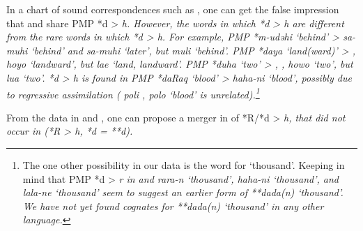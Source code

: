 In a chart of sound correspondences such as ,
one can get the false impression that 
and  share PMP *d > \it{h}.
However, the words in which  *d > \it{h} are different
from the rare  words in which *d > \it{h}.
For example, PMP *m-udəhi ‘behind’ >  \it{sa-muhi} ‘behind’
and  \it{sa-muhi} ‘later’,
but  \it{muli} ‘behind’.
PMP *daya ‘land(ward)’ > ,
 \it{hoyo} ‘landward’, but  \it{lae} ‘land, landward’.
PMP *duha ‘two’ > ,
,  \it{howo} ‘two’, but  \it{lua} ‘two’.
 *d > \it{h} is found in PMP *daRaq ‘blood’ > \it{haha-ni}
‘blood’, possibly due to regressive assimilation ( \it{poli} ,
 \it{polo} ‘blood’ is unrelated).\footnote{
		The one other
		possibility in our data is the word for ‘thousand’.
		Keeping in mind that PMP *d > \it{r} in 
		and  \it{rara-n} ‘thousand’,
		 \it{haha-ni} ‘thousand’, and  \it{lala-ne} ‘thousand’
		seem to suggest an earlier form of **dada(n) ‘thousand’. We have
		not yet found cognates for **dada(n) ‘thousand’ in any other
		language.} 

From the data in 
and , one can propose a merger in  of
*R/*d > \it{h}, that did not occur in  (*R > \it{h}, *d = **d).

